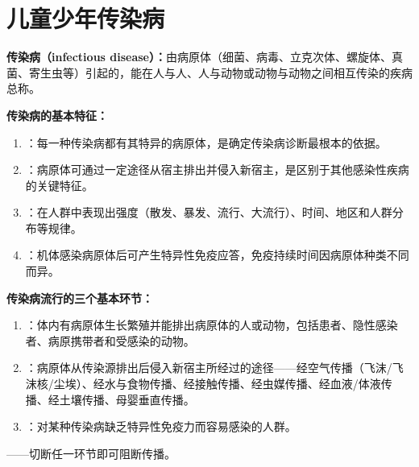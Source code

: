 \chapter{儿童少年传染病}
\setcounter{chapter}{9}

\begin{defbox}
\textbf{传染病（infectious disease）：}由病原体（细菌、病毒、立克次体、螺旋体、真菌、寄生虫等）引起的，能在人与人、人与动物或动物与动物之间相互传染的疾病总称。
\end{defbox}

\begin{keybox}
\textbf{传染病的基本特征：}
\begin{enumerate}[leftmargin=*]
    \item {}：每一种传染病都有其特异的病原体，是确定传染病诊断最根本的依据。
    \item {}：病原体可通过一定途径从宿主排出并侵入新宿主，是区别于其他感染性疾病的关键特征。
    \item {}：在人群中表现出强度（散发、暴发、流行、大流行）、时间、地区和人群分布等规律。
    \item {}：机体感染病原体后可产生特异性免疫应答，免疫持续时间因病原体种类不同而异。
\end{enumerate}

\textbf{传染病流行的三个基本环节：}
\begin{enumerate}[leftmargin=*]
    \item {}：体内有病原体生长繁殖并能排出病原体的人或动物，包括患者、隐性感染者、病原携带者和受感染的动物。
    \item {}：病原体从传染源排出后侵入新宿主所经过的途径——经空气传播（飞沫/飞沫核/尘埃）、经水与食物传播、经接触传播、经虫媒传播、经血液/体液传播、经土壤传播、母婴垂直传播。
    \item {}：对某种传染病缺乏特异性免疫力而容易感染的人群。
\end{enumerate}
——切断任一环节即可阻断传播。
\end{keybox}

